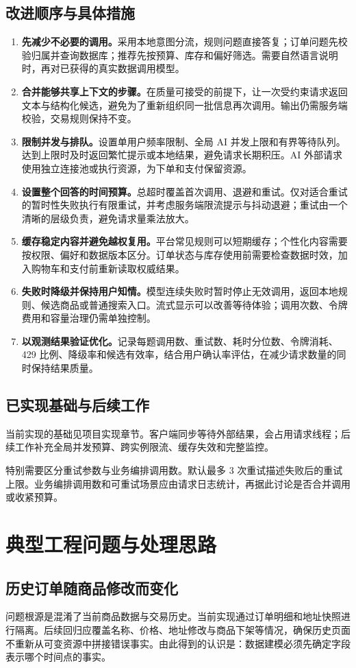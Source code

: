 \subsection{改进顺序与具体措施}
\begin{enumerate}
\item \textbf{先减少不必要的调用。}采用本地意图分流，规则问题直接答复；订单问题先校验归属并查询数据库；推荐先按预算、库存和偏好筛选。需要自然语言说明时，再对已获得的真实数据调用模型。
\item \textbf{合并能够共享上下文的步骤。}在质量可接受的前提下，让一次受约束请求返回文本与结构化候选，避免为了重新组织同一批信息再次调用。输出仍需服务端校验，交易规则保持不变。
\item \textbf{限制并发与排队。}设置单用户频率限制、全局 AI 并发上限和有界等待队列。达到上限时及时返回繁忙提示或本地结果，避免请求长期积压。AI 外部请求使用独立连接池或执行资源，为下单和支付保留资源。
\item \textbf{设置整个回答的时间预算。}总超时覆盖首次调用、退避和重试。仅对适合重试的暂时性失败执行有限重试，并考虑服务端限流提示与抖动退避；重试由一个清晰的层级负责，避免请求量乘法放大。
\item \textbf{缓存稳定内容并避免越权复用。}平台常见规则可以短期缓存；个性化内容需要按权限、偏好和数据版本区分。订单状态与库存使用前需要检查数据时效，加入购物车和支付前重新读取权威结果。
\item \textbf{失败时降级并保持用户知情。}模型连续失败时暂时停止无效调用，返回本地规则、候选商品或普通搜索入口。流式显示可以改善等待体验；调用次数、令牌费用和容量治理仍需单独控制。
\item \textbf{以观测结果验证优化。}记录每题调用数、重试数、耗时分位数、令牌消耗、429 比例、降级率和候选有效率，结合用户确认率评估，在减少请求数量的同时保持结果质量。
\end{enumerate}
\subsection{已实现基础与后续工作}
当前实现的基础见项目实现章节。客户端同步等待外部结果，会占用请求线程；后续工作补充全局并发预算、跨实例限流、缓存失效和完整监控。

特别需要区分重试参数与业务编排调用数。默认最多 3 次重试描述失败后的重试上限。业务编排调用数和可重试场景应由请求日志统计，再据此讨论是否合并调用或收紧预算。
\section{典型工程问题与处理思路}
\subsection{历史订单随商品修改而变化}
问题根源是混淆了当前商品数据与交易历史。当前实现通过订单明细和地址快照进行隔离。后续回归应覆盖名称、价格、地址修改与商品下架等情况，确保历史页面不重新从可变资源中拼接错误事实。由此得到的认识是：数据建模必须先确定字段表示哪个时间点的事实。
